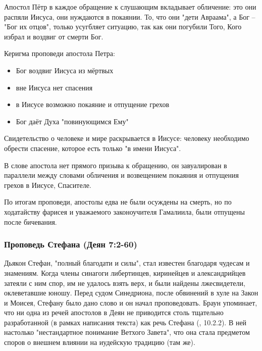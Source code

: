Апостол Пётр в каждое обращение к слушающим вкладывает обличение: это они распяли Иисуса, они нуждаются в покаянии.
То, что они "дети Авраама", а Бог – "Бог их отцов", только усугбляет ситуацию, так как они погубили Того, Кого избрал и воздвиг от смерти Бог.



Керигма проповеди апостола Петра:
\begin{itemize}
	\item Бог воздвиг Иисуса из мёртвых
	\item вне Иисуса нет спасения
	\item в Иисусе возможно покаяние и отпущение грехов
	\item Бог даёт Духа "повинующимся Ему"
\end{itemize}

Свидетельство о человеке и мире раскрывается в Иисусе: человеку необходимо обрести спасение, которое есть только "в имени Иисуса".

В слове апостола нет прямого призыва к обращению, он завуалирован в параллели между словами обличения и возвещением покаяния и отпущения грехов в Иисусе, Спасителе.

По итогам проповеди, апостолы едва не были осуждены на смерть, но по ходатайству фарисея и уважаемого законоучителя Гамалиила, были отпущены после бичевания.


\subsubsection*{Проповедь Стефана (Деян 7:2-60)}
Дьякон Стефан, "полный благодати и силы", стал известен благодаря чудесам и знамениям.
Когда члены синагоги либертинцев, киринейцев и александрийцев затеяли с ним спор, им не удалось взять верх, и были найдены лжесвидетели, оклеветавшие юношу.
Перед судом Синедриона, после обвинений в хуле на Закон и Моисея, Стефану было дано слово и он начал проповедовать.
Браун упоминает, что ни одна из речей апостолов в Деян не приводится столь тщательно разработанной (в рамках написания текста) как речь Стефана (\cite{@brown.vvedenie_1}, 10.2.2).
В ней настолько "нестандартное понимание Ветхого Завета", что она стала предметом споров о внешнем влиянии на иудейскую традицию (там же).


